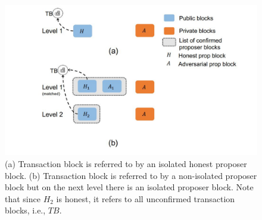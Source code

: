 \documentclass{report}
\begin{document}
\begin{center}
	\begin{figure}
		\centering
		\includegraphics[width=0.8\linewidth]{Fig/F5}
		\caption{(a) Transaction block is referred to by an isolated honest proposer block. (b) Transaction block is referred to by a non-isolated proposer block but on the next level there is an isolated proposer block. Note that since $H_{2}$ is honest, it refers to all unconfirmed transaction blocks, i.e., $TB$.}
		\label{fig:f5}
	\end{figure}
\end{center}
\end{document}
